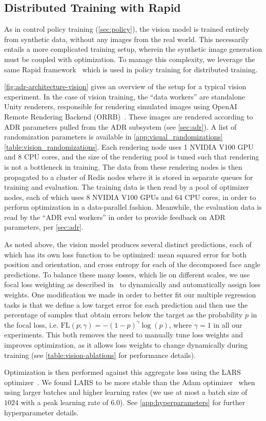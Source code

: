 \subsection{Distributed Training with Rapid}

As in control policy training (\autoref{sec:policy}), the vision model is trained entirely from synthetic data, without any images from the real world. This necessarily entails a more complicated training setup, wherein the synthetic image generation must be coupled with optimization. To manage this complexity, we leverage the same Rapid framework~\citep{five} which is used in policy training for distributed training.

\autoref{fig:adr-architecture-vision} gives an overview of the setup for a typical vision experiment. In the case of vision training, the ``data workers'' are standalone Unity renderers, responsible for rendering simulated images using OpenAI Remote Rendering Backend (ORRB)~\cite{chociej2019orrb}. These images are rendered according to ADR parameters pulled from the ADR subsystem (see \autoref{sec:adr}). A list of randomization parameters is available in \autoref{app:visual_randomizations} \autoref{table:vision_randomizations}. Each rendering node uses 1 NVIDIA V100 GPU and 8 CPU cores, and the size of the rendering pool is tuned such that rendering is not a bottleneck in training. The data from these rendering nodes is then propagated to a cluster of Redis nodes where it is stored in separate queues for training and evaluation. The training data is then read by a pool of optimizer nodes, each of which uses 8 NVIDIA V100 GPUs and 64 CPU cores, in order to perform optimization in a data-parallel fashion. Meanwhile, the evaluation data is read by the ``ADR eval workers'' in order to provide feedback on ADR parameters, per \autoref{sec:adr}.


As noted above, the vision model produces several distinct predictions, each of which has its own loss function to be optimized: mean squared error for both position and orientation, and cross entropy for each of the decomposed face angle predictions. To balance these many losses, which lie on different scales, we use focal loss weighting as described in~\cite{guo2018dynamic} to dynamically and automatically assign loss weights. One modification we made in order to better fit our multiple regression tasks is that we define a low target error for each prediction and then use the percentage of samples that obtain errors below the target as the probability $p$ in the focal loss, i.e. $\text{FL}(p; \gamma) = - (1-p)^\gamma \log(p)$, where $\gamma=1$ in all our experiments. This both removes the need to manually tune loss weights and improves optimization, as it allows loss weights to change dynamically during training (see \autoref{table:vision-ablations} for performance details). 

Optimization is then performed against this aggregate loss using the LARS optimizer~\cite{LARS}. We found LARS to be more stable than the Adam optimizer~\cite{Kingma2014AdamAM} when using larger batches and higher learning rates (we use at most a batch size of $1024$ with a peak learning rate of $6.0$). See \autoref{app:hyperparameters} for further hyperparameter details.